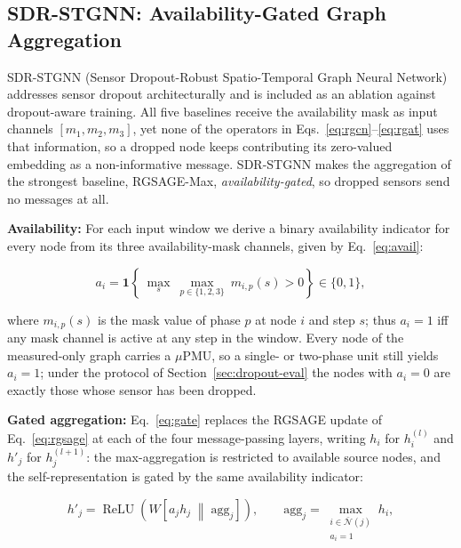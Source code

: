 \documentclass[3p,times,procedia]{elsarticle}
\begin{document}
\subsection{SDR-STGNN: Availability-Gated Graph Aggregation}
\label{sec:sdr}

SDR-STGNN (Sensor Dropout-Robust Spatio-Temporal Graph Neural Network) addresses sensor dropout architecturally and is included as an ablation against dropout-aware training. All five baselines receive the availability mask as input channels $[m_1,m_2,m_3]$, yet none of the operators in Eqs.~\eqref{eq:rgcn}--\eqref{eq:rgat} uses that information, so a dropped node keeps contributing its zero-valued embedding as a non-informative message. SDR-STGNN makes the aggregation of the strongest baseline, RGSAGE-Max, \emph{availability-gated}, so dropped sensors send no messages at all.

\textbf{Availability:} For each input window we derive a binary availability indicator for every node from its three availability-mask channels, given by Eq.~\eqref{eq:avail}:

\begin{equation}
a_i = \mathbf{1}\!\left\{\ \max_{s}\ \max_{p\in\{1,2,3\}}\ m_{i,p}(s) > 0 \right\}
\in \{0,1\},
\label{eq:avail}
\end{equation}

where $m_{i,p}(s)$ is the mask value of phase $p$ at node $i$ and step $s$; thus $a_i=1$ iff any mask channel is active at any step in the window. Every node of the measured-only graph carries a $\mu$PMU, so a single- or two-phase unit still yields $a_i=1$; under the protocol of Section~\ref{sec:dropout-eval} the nodes with $a_i=0$ are exactly those whose sensor has been dropped.

\textbf{Gated aggregation:} Eq.~\eqref{eq:gate} replaces the RGSAGE update of Eq.~\eqref{eq:rgsage} at each of the four message-passing layers, writing $h_i$ for $h^{(l)}_i$ and $h'_j$ for $h^{(l+1)}_j$: the max-aggregation is restricted to available source nodes, and the self-representation is gated by the same availability indicator:

\begin{equation}
\label{eq:gate}
h'_j =
\operatorname{ReLU}\!\left(
W \left[ a_j h_j \;\middle\|\; \mathrm{agg}_j \right]
\right),
\qquad
\mathrm{agg}_j = \!\!\max_{\substack{i \in \bar{\mathcal N}(j)\\ a_i=1}}\!\! h_i ,
\end{equation}
\end{document}
